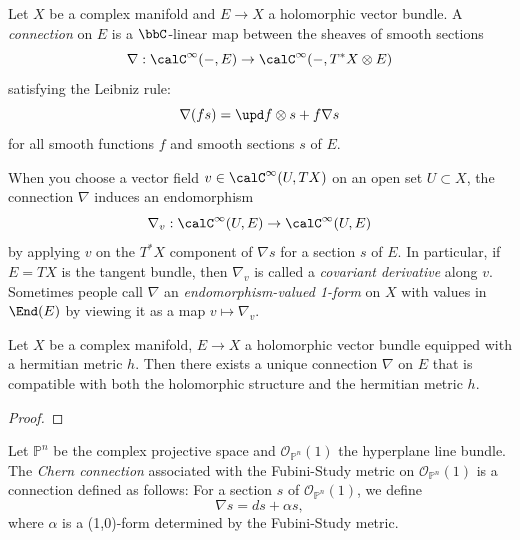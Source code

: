     \begin{definition}\label{def:connection_on_holomorphic_vector_bundles}
        Let \(X\) be a complex manifold and \(E \to X\) a holomorphic vector bundle.
        A \emph{connection} on \(E\) is a \(\bbC\)-linear map between the sheaves of smooth sections
        \[\nabla: \calC^\infty(-, E) \to \calC^\infty(-, T^*X \otimes E)\]
        satisfying the Leibniz rule:
        \[\nabla(fs) = \upd f \otimes s + f \nabla s\]
        for all smooth functions \(f\) and smooth sections \(s\) of \(E\).
    \end{definition}

    When you choose a vector field \(v \in \calC^\infty(U, TX)\) on an open set \(U \subset X\), the connection \(\nabla\) induces an endomorphism
    \[\nabla_v: \calC^\infty(U, E) \to \calC^\infty(U, E)\]
    by applying \(v\) on the \(T^*X\) component of \(\nabla s\) for a section \(s\) of \(E\).
    In particular, if \(E = TX\) is the tangent bundle, then \(\nabla_v\) is called a \emph{covariant derivative} along \(v\).
    Sometimes people call \(\nabla\) an \emph{endomorphism-valued 1-form} on \(X\) with values in \(\End(E)\) by viewing it as a map \(v \mapsto \nabla_v\).

    \begin{proposition}\label{prop:unique_compatible_connection_on_hermitian_vector_bundle}
        Let \(X\) be a complex manifold, \(E \to X\) a holomorphic vector bundle equipped with a hermitian metric \(h\).
        Then there exists a unique connection \(\nabla\) on \(E\) that is compatible with both the holomorphic structure and the hermitian metric \(h\).
    \end{proposition}
    \begin{proof}
    \end{proof}

    \begin{example}\label{eg:connection_on_P^n}
        Let \(\mathbb{P}^n\) be the complex projective space and \(\mathcal{O}_{\mathbb{P}^n}(1)\) the hyperplane line bundle.
        The \emph{Chern connection} associated with the Fubini-Study metric on \(\mathcal{O}_{\mathbb{P}^n}(1)\) is a connection defined as follows:
        For a section \(s\) of \(\mathcal{O}_{\mathbb{P}^n}(1)\), we define
        \[\nabla s = ds + \alpha s,\]
        where \(\alpha\) is a (1,0)-form determined by the Fubini-Study metric.
    \end{example}

